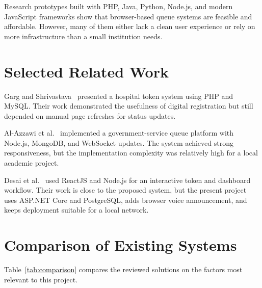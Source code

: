 Research prototypes built with PHP, Java, Python, Node.js, and modern JavaScript frameworks show that browser-based queue systems are feasible and affordable. However, many of them either lack a clean user experience or rely on more infrastructure than a small institution needs.

\section{Selected Related Work}

Garg and Shrivastava~\cite{garg2019} presented a hospital token system using PHP and MySQL. Their work demonstrated the usefulness of digital registration but still depended on manual page refreshes for status updates.

Al-Azzawi et al.~\cite{alazzawi2020} implemented a government-service queue platform with Node.js, MongoDB, and WebSocket updates. The system achieved strong responsiveness, but the implementation complexity was relatively high for a local academic project.

Desai et al.~\cite{desai2022} used ReactJS and Node.js for an interactive token and dashboard workflow. Their work is close to the proposed system, but the present project uses ASP.NET Core and PostgreSQL, adds browser voice announcement, and keeps deployment suitable for a local network.

\section{Comparison of Existing Systems}

Table~\ref{tab:comparison} compares the reviewed solutions on the factors most relevant to this project.

